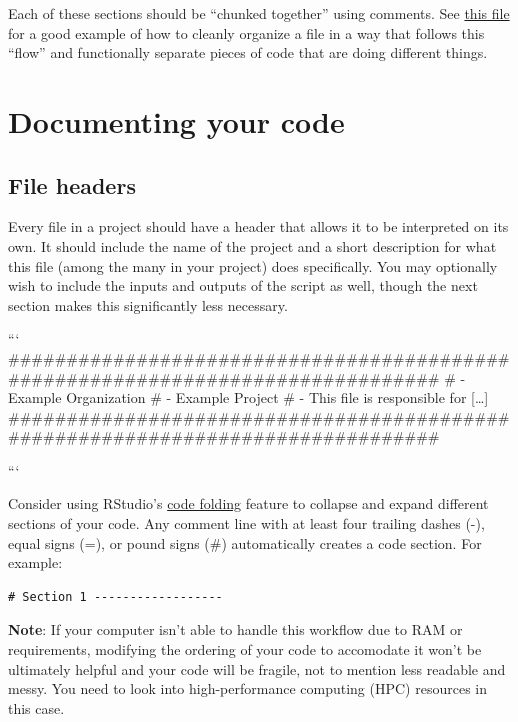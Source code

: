 \documentclass[]{book}
\begin{document}
Each of these sections should be ``chunked together'' using comments.
See
\href{https://github.com/kmishra9/Flu-Absenteeism/blob/master/Master's\%20Thesis\%20-\%20Spatial\%20Epidemiology\%20of\%20Influenza/2a\%20-\%20Statistical-Inputs.R}{this
file} for a good example of how to cleanly organize a file in a way that
follows this ``flow'' and functionally separate pieces of code that are
doing different things.

\section{Documenting your code}\label{documenting-your-code}

\subsection{File headers}\label{file-headers}

Every file in a project should have a header that allows it to be
interpreted on its own. It should include the name of the project and a
short description for what this file (among the many in your project)
does specifically. You may optionally wish to include the inputs and
outputs of the script as well, though the next section makes this
significantly less necessary.

```
\#\#\#\#\#\#\#\#\#\#\#\#\#\#\#\#\#\#\#\#\#\#\#\#\#\#\#\#\#\#\#\#\#\#\#\#\#\#\#\#\#\#\#\#\#\#\#\#\#\#\#\#\#\#\#\#\#\#\#\#\#\#\#\#\#\#\#\#\#\#\#\#\#\#\#\#\#\#\#\#
\# \citet{Organization} - Example Organization \# \citet{Project} -
Example Project \# \citet{Description} - This file is responsible for
{[}\ldots{}{]}
\#\#\#\#\#\#\#\#\#\#\#\#\#\#\#\#\#\#\#\#\#\#\#\#\#\#\#\#\#\#\#\#\#\#\#\#\#\#\#\#\#\#\#\#\#\#\#\#\#\#\#\#\#\#\#\#\#\#\#\#\#\#\#\#\#\#\#\#\#\#\#\#\#\#\#\#\#\#\#\#

```

Consider using RStudio's
\href{https://support.rstudio.com/hc/en-us/articles/200484568-Code-Folding-and-Sections}{code
folding} feature to collapse and expand different sections of your code.
Any comment line with at least four trailing dashes (-), equal signs
(=), or pound signs (\#) automatically creates a code section. For
example:

\begin{verbatim}
# Section 1 ------------------
\end{verbatim}

\textbf{Note}: If your computer isn't able to handle this workflow due
to RAM or requirements, modifying the ordering of your code to
accomodate it won't be ultimately helpful and your code will be fragile,
not to mention less readable and messy. You need to look into
high-performance computing (HPC) resources in this case.
\end{document}
